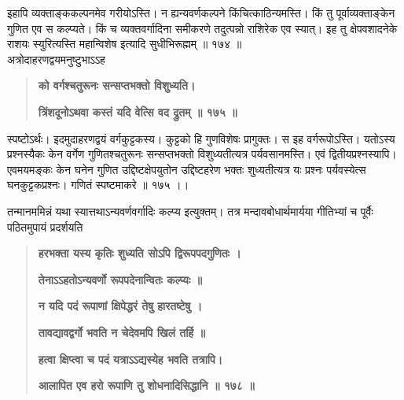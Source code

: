 \documentclass[11pt, openany]{book}
\begin{document}
\begin{sloppypar}
\hangindent=0.2in इहापि व्यक्ताङ्ककल्पनमेव गरीयोऽस्ति। न ह्यन्यवर्णकल्पने किंचित्काठिन्यमस्ति। किं तु पूर्वाव्यक्ताङ्केन गुणित एव स कल्प्यते। किं च व्यक्तवर्गादिना समीकरणे तदुत्पन्नो राशिरेक एव स्यात्। इह तु क्षेपवशादनेके राशयः स्युरित्यस्ति महान्विशेष इत्यादि सुधीभिरूह्मम् ॥ १७४ ॥\\

\hangindent=0.2in \hspace{0.2in}अत्रोदाहरणद्वयमनुष्टुभाऽऽह\textendash

\begin{quote}
\hspace{1in}\textbf{को वर्गश्चतुरूनः सन्सप्तभक्तो विशुध्यति।}

\hspace{1in}\textbf{त्रिंशदूनोऽथवा कस्तं यदि वेत्सि वद द्रुतम् ॥ १७५ ॥}
\end{quote}

\hangindent=0.2in \hspace{0.2in}स्पष्टोऽर्थः। इदमुदाहरणद्वयं वर्गकुट्टकस्य। कुट्टको हि गुणविशेषः प्रागुक्तः। स इह वर्गरूपोऽस्ति। यतोऽस्य प्रश्नस्यैकः केन वर्गेण गुणितश्चतुरूनः सन्सप्तभक्तो विशुध्यतीत्यत्र पर्यवसानमस्ति। एवं द्वितीयप्रश्नस्यापि। एवमयमङ्कः केन घनेन गुणित उद्दिष्टक्षेपयुतोन उद्दिष्टहरेण भक्तः शुध्यतीत्यत्र यः प्रश्नः पर्यवस्येत्स घनकुट्टकप्रश्नः। गणितं स्पष्टमाकरे ॥ १७५ ।।

\hangindent=0.2in \hspace{0.2in}तन्मानममिन्नं यथा स्यात्तथाऽन्यवर्णवर्गादिः कल्प्य इत्युक्तम्। तत्र मन्दावबोधार्थमार्यया गीतिभ्यां च पूर्वैः पठितमुपायं प्रदर्शयति\textendash

\begin{quote}
\hspace{1in}\textbf{हरभक्ता यस्य कृतिः शुध्यति सोऽपि द्विरूपपदगुणितः ।}

\hspace{1in}\textbf{तेनाऽऽहतोऽन्यवर्णो रूपपदेनान्वितः कल्प्यः ॥}

\hspace{1in}\textbf{न यदि पदं रूपाणां क्षिपेद्धरं तेषु हारतष्टेषु ।}
 
\hspace{1in}\textbf{तावद्यावद्वर्गो भवति न चेदेवमपि खिलं तर्हि ॥}

\hspace{1in}\textbf{हत्वा क्षिप्त्वा च पदं यत्राऽऽद्यस्येह भवति तत्रापि।}

\hspace{1in}\textbf{आलापित एव हरो रूपाणि तु शोधनादिसिद्धानि ॥ १७८ ॥}
\end{quote}


\end{sloppypar}
\end{document}
